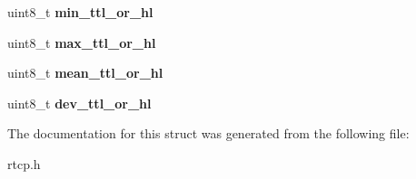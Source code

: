 \begin{DoxyCompactItemize}
uint8\+\_\+t {\bfseries min\+\_\+ttl\+\_\+or\+\_\+hl}
\item 
\mbox{\label{structrtcp__xr__stat__summary__report__block_ae04519e0e87a6b7a537026118583c5c3}} 
uint8\+\_\+t {\bfseries max\+\_\+ttl\+\_\+or\+\_\+hl}
\item 
\mbox{\label{structrtcp__xr__stat__summary__report__block_a26f60283d10b5b663e9142910ceabf72}} 
uint8\+\_\+t {\bfseries mean\+\_\+ttl\+\_\+or\+\_\+hl}
\item 
\mbox{\label{structrtcp__xr__stat__summary__report__block_a3315ed8278efedaa8b875ca593873475}} 
uint8\+\_\+t {\bfseries dev\+\_\+ttl\+\_\+or\+\_\+hl}
\end{DoxyCompactItemize}


The documentation for this struct was generated from the following file\+:\begin{DoxyCompactItemize}
\item 
rtcp.\+h\end{DoxyCompactItemize}
